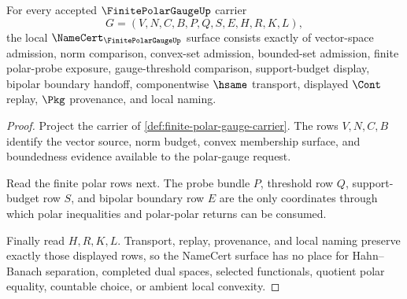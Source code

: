 \begin{theorem}
\label{thm:finite-polar-gauge-namecert-obligations}
For every accepted $\FinitePolarGaugeUp$ carrier
$$
G=(V,N,C,B,P,Q,S,E,H,R,K,L),
$$
the local $\NameCert_{\FinitePolarGaugeUp}$ surface consists exactly of vector-space admission, norm comparison, convex-set admission, bounded-set admission, finite polar-probe exposure, gauge-threshold comparison, support-budget display, bipolar boundary handoff, componentwise $\hsame$ transport, displayed $\Cont$ replay, $\Pkg$ provenance, and local naming.
\end{theorem}
\begin{proof}
Project the carrier of \autoref{def:finite-polar-gauge-carrier}. The rows $V,N,C,B$ identify the vector source, norm budget, convex membership surface, and boundedness evidence available to the polar-gauge request.

Read the finite polar rows next. The probe bundle $P$, threshold row $Q$, support-budget row $S$, and bipolar boundary row $E$ are the only coordinates through which polar inequalities and polar-polar returns can be consumed.

Finally read $H,R,K,L$. Transport, replay, provenance, and local naming preserve exactly those displayed rows, so the NameCert surface has no place for Hahn--Banach separation, completed dual spaces, selected functionals, quotient polar equality, countable choice, or ambient local convexity.
\end{proof}

